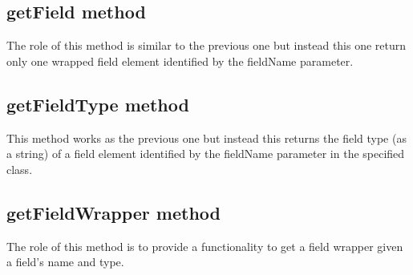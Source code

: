 \subsection{getField method}
The role of this method is similar to the previous one but instead this one return only one wrapped field element identified by the fieldName parameter.

\subsection{getFieldType method}
This method works as the previous one but instead this returns the field type (as a string) of a field element identified by the fieldName parameter in the specified class.

\subsection{getFieldWrapper method}
The role of this method is to provide a functionality to get a field wrapper given a field's name and type.